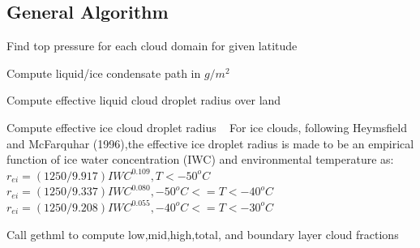 \hypertarget{namespacemodule__radsw__main_general}{}\subsection{General Algorithm}\label{namespacemodule__radsw__main_general}

\begin{DoxyEnumerate}
\item Find top pressure for each cloud domain for given latitude
\item Compute liquid/ice condensate path in $ g/m^2 $
\item Compute effective liquid cloud droplet radius over land
\item Compute effective ice cloud droplet radius ~\newline
 For ice clouds, following Heymsfield and Mc\+Farquhar (1996),the effective ice droplet radius is made to be an empirical function of ice water concentration (I\+WC) and environmental temperature as\+: ~\newline
 $ r_{ei} = (1250/9.917)IWC^{0.109},T<-50^oC $ ~\newline
 $ r_{ei} = (1250/9.337)IWC^{0.080},-50^oC<=T<-40^oC $ ~\newline
 $ r_{ei} = (1250/9.208)IWC^{0.055},-40^oC<=T<-30^oC $ ~\newline

\item Call gethml to compute low,mid,high,total, and boundary layer cloud fractions 
\end{DoxyEnumerate}

